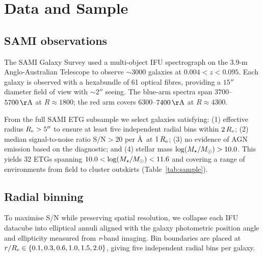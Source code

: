 \section{Data and Sample}
\label{sec:data}

\subsection{SAMI observations}

The SAMI Galaxy Survey \citep{Croom2012} used a multi-object IFU
spectrograph on the 3.9-m Anglo-Australian Telescope to observe
$\sim$3000 galaxies at $0.004 < z < 0.095$.
Each galaxy is observed with a hexabundle of 61 optical fibres,
providing a $15''$ diameter field of view with $\sim$$2''$ seeing.
The blue-arm spectra span $3700$--$5700\,\mathrm{\AA}$ at
$R \approx 1800$; the red arm covers $6300$--$7400\,\mathrm{\AA}$
at $R \approx 4300$.

From the full SAMI ETG subsample we select galaxies satisfying:
(1) effective radius $R_{\mathrm{e}} > 5''$ to ensure at least five independent
    radial bins within $2\,R_{\mathrm{e}}$;
(2) median signal-to-noise ratio $\mathrm{S/N} > 20$ per
    \AA\ at $1\,R_{\mathrm{e}}$;
(3) no evidence of AGN emission based on the \citet{Kewley2001}
    diagnostic; and
(4) stellar mass $\log(M_{\star}/M_{\odot}) > 10.0$.
This yields 32 ETGs spanning $10.0 < \log(M_{\star}/M_{\odot}) < 11.6$
and covering a range of environments from field to cluster outskirts
(Table~\ref{tab:sample}).

\subsection{Radial binning}

To maximise S/N while preserving spatial resolution, we collapse
each IFU datacube into elliptical annuli aligned with the galaxy
photometric position angle and ellipticity measured from
\textit{r}-band imaging.
Bin boundaries are placed at
$r/R_{\mathrm{e}} \in \{0.1, 0.3, 0.6, 1.0, 1.5, 2.0\}$,
giving five independent radial bins per galaxy.

